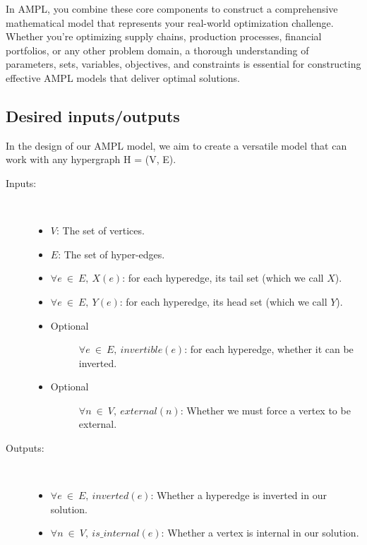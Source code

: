     


In AMPL, you combine these core components to construct a comprehensive mathematical model that represents your real-world optimization challenge. Whether you're optimizing supply chains, production processes, financial portfolios, or any other problem domain, a thorough understanding of parameters, sets, variables, objectives, and constraints is essential for constructing effective AMPL models that deliver optimal solutions.


\subsection{Desired inputs/outputs} \label{sec:io}
In the design of our AMPL model, we aim to create a versatile model that can work with any hypergraph  H = (V, E).

\begin{description}
    \item[Inputs:] ~
    \begin{itemize}
        \item $V$: The set of vertices. 
        \item $E$: The set of hyper-edges.
        \item $\forall e\ \in\ E,\ X(e)$: for each hyperedge, its tail set (which we call $X$).
        \item $\forall e\ \in\ E,\ Y(e)$: for each hyperedge, its head set (which we call $Y$).
        \item \begin{description}
            \item[Optional] $\forall e\ \in\ E,\ invertible(e)$: for each hyperedge, whether it can be inverted.
        \end{description}
        \item \begin{description}
            \item[Optional] $\forall n\ \in\ V,\ external(n)$: Whether we must force a vertex to be external.
        \end{description}
    \end{itemize}
    \item[Outputs:] ~
    \begin{itemize}
        \item $\forall e\ \in\ E,\ inverted(e)$: Whether a hyperedge is inverted in our solution.
        \item $\forall n\ \in\ V,\ is\_internal(e)$: Whether a vertex is internal in our solution.
    \end{itemize}
\end{description}

